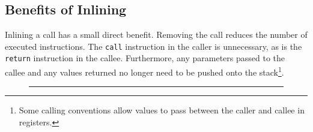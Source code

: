 \subsection{Benefits of Inlining}

Inlining a call has a small direct benefit.  Removing the call reduces
the number of executed instructions.  The {\tt call} instruction in
the caller is unnecessary, as is the {\tt return} instruction in the
callee.  Furthermore, any parameters passed to the callee and any
values returned no longer need to be pushed onto the
stack\footnote{Some calling conventions allow values to pass between
  the caller and callee in registers.}.

\begin{figure}
  \centering
  
  \begin{minipage}[t]{\linewidth}
    \vspace{1em}
    \hrule
    \vspace{1em}
  \end{minipage}

\end{figure}
